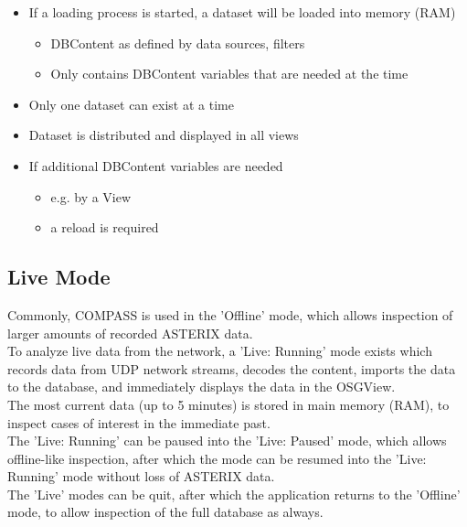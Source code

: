 \begin{itemize}
\item If a loading process is started, a dataset will be loaded into memory (RAM)
\begin{itemize}
\item DBContent as defined by data sources, filters
\item Only contains DBContent variables that are needed at the time
\end{itemize}
\item Only one dataset can exist at a time
\item Dataset is distributed and displayed in all views
\item If additional DBContent variables are needed
\begin{itemize}
\item e.g. by a View
\item a reload is required
\end{itemize}
\end{itemize}

\subsection*{Live Mode}
Commonly, COMPASS is used in the 'Offline' mode, which allows inspection of larger amounts of recorded ASTERIX data. \\

To analyze live data from the network, a 'Live: Running' mode exists which records data from UDP network streams, decodes the content, imports the data to the database, and immediately displays the data in the OSGView. \\

The most current data (up to 5 minutes) is stored in main memory (RAM), to inspect cases of interest in the immediate past. \\

The 'Live: Running' can be paused into the 'Live: Paused' mode, which allows offline-like inspection, after which the mode can be resumed into the 'Live: Running' mode without loss of ASTERIX data. \\

The 'Live' modes can be quit, after which the application returns to the 'Offline' mode, to allow inspection of the full database as always.

 
